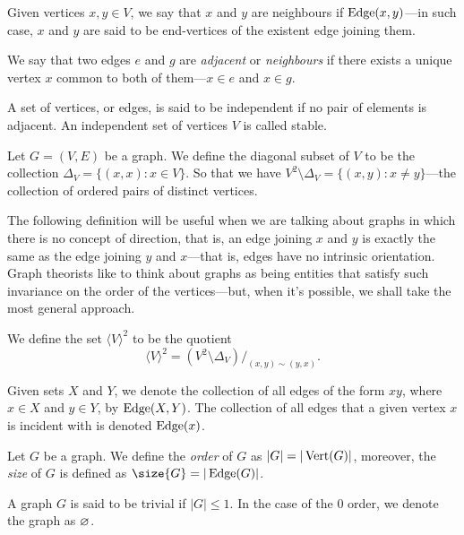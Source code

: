 \begin{definition}[Adjacency]
Given vertices \(x, y \in V\), we say that \(x\) and \(y\) are neighbours if
\(\operatorname{Edge}(x, y)\)---in such case, \(x\) and \(y\) are said to be end-vertices of
the existent edge joining them.

We say that two edges \(e\) and \(g\) are \emph{adjacent} or \emph{neighbours}
if there exists a unique vertex \(x\) common to both of them---\(x \in e\)
and \(x \in g\).

A set of vertices, or edges, is said to be independent if no pair of elements
is adjacent. An independent set of vertices \(V\) is called stable.
\end{definition}

\begin{definition}
Let \(G = (V, E)\) be a graph. We define the diagonal subset of \(V\) to be
the collection \(\Delta_V = \{(x, x) \colon x \in V\}\). So that we have
\(V^2 \setminus \Delta_V = \{(x, y) \colon x \neq y\}\)---the collection of
ordered pairs of distinct vertices.
\end{definition}

The following definition will be useful when we are talking about graphs in
which there is no concept of direction, that is, an edge joining \(x\) and \(y\)
is exactly the same as the edge joining \(y\) and \(x\)---that is, edges have
no intrinsic orientation. Graph theorists like to think about graphs as being
entities that satisfy such invariance on the order of the vertices---but, when
it's possible, we shall take the most general approach.

\begin{definition}
We define the set \(\langle V \rangle^2\) to be the quotient
\[
  \langle V \rangle^2 = (V^2 \setminus \Delta_V)/_{(x, y) \sim (y, x)}.
\]
\end{definition}

\begin{notation}
Given sets \(X\) and \(Y\), we denote the collection of all edges of the form
\(xy\), where \(x \in X\) and \(y \in Y\), by \(\operatorname{Edge}(X, Y)\). The collection of
all edges that a given vertex \(x\) is incident with is denoted \(\operatorname{Edge}(x)\).
\end{notation}

\begin{definition}\label{def:graph-order-size}
Let \(G\) be a graph. We define the \emph{order} of \(G\) as
\(|G| =|\operatorname{Vert}(G)|\), moreover, the \emph{size} of \(G\) is defined as
\(\size{G} = |\Edge(G)|\).
\end{definition}

\begin{definition}
A graph \(G\) is said to be trivial if \(|G| \leq 1\). In the case of the
\(0\) order, we denote the graph as \(\varnothing\).
\end{definition}
